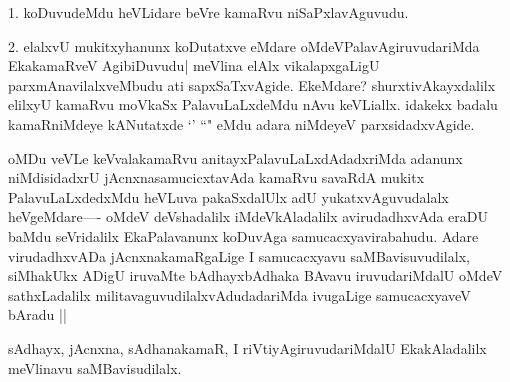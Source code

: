 \begin{artha}
1. koDuvudeMdu heVLidare beVre kamaRvu niSaPxlavAguvudu.
\end{artha}

\begin{artha}
2. elalxvU mukitxyhanunx koDutatxve eMdare oMdeVPalavAgiruvudariMda EkakamaRveV AgibiDuvudu|
meVlina elAlx vikalapxgaLigU parxmAnavilalxveMbudu ati sapxSaTxvAgide. EkeMdare? shurxtivAkayxdalilx elilxyU kamaRvu moVkaSx PalavuLaLxdeMdu nAvu keVLiallx. idakekx badalu kamaRniMdeye kANutatxde `\stext' ``\stext" eMdu adara niMdeyeV parxsidadxvAgide.
\end{artha}

\begin{artha}
oMDu veVLe keVvalakamaRvu anitayxPalavuLaLxdAdadxriMda adanunx niMdisidadxrU jAcnxnasamucicxtavAda kamaRvu savaRdA mukitx PalavuLaLxdedxMdu heVLuva pakaSxdalUlx adU yukatxvAguvudalalx heVgeMdare---- oMdeV deVshadalilx iMdeVkAladalilx avirudadhxvAda eraDU baMdu seVridalilx EkaPalavanunx koDuvAga samucacxyavirabahudu. Adare virudadhxvADa jAcnxnakamaRgaLige I samucacxyavu saMBavisuvudilalx, siMhakUkx ADigU iruvaMte bAdhayxbAdhaka BAvavu iruvudariMdalU oMdeV sathxLadalilx militavaguvudilalxvAdudadariMda ivugaLige samucacxyaveV bAradu ||
\end{artha}

\begin{artha}
sAdhayx, jAcnxna, sAdhanakamaR, I riVtiyAgiruvudariMdalU EkakAladalilx meVlinavu 
saMBavisudilalx.
\end{artha}
